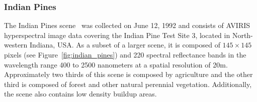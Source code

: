 \documentclass[information,article,submit,moreauthors,pdftex]{Definitions/mdpi}
\begin{document}
\begin{paracol}{2}
\subsubsection*{Indian Pines} 

The Indian Pines scene~\citep{Baumgardner2015} was collected on June 12, 1992
and consists of AVIRIS hyperspectral image data covering the Indian Pine Test
Site 3, located in North-western Indiana, USA. As a subset of a larger scene,
it is composed of $145 \times 145$ pixels (see Figure~\ref{fig:indian_pines})
and 220 spectral reflectance bands in the wavelength range 400 to 2500
nanometers at a spatial resolution of 20m. Approximately two thirds of
this scene is composed by agriculture and the other third is composed of
forest and other natural perennial vegetation. Additionally, the scene also
contains low density buildup areas.

\end{paracol}
\end{document}
